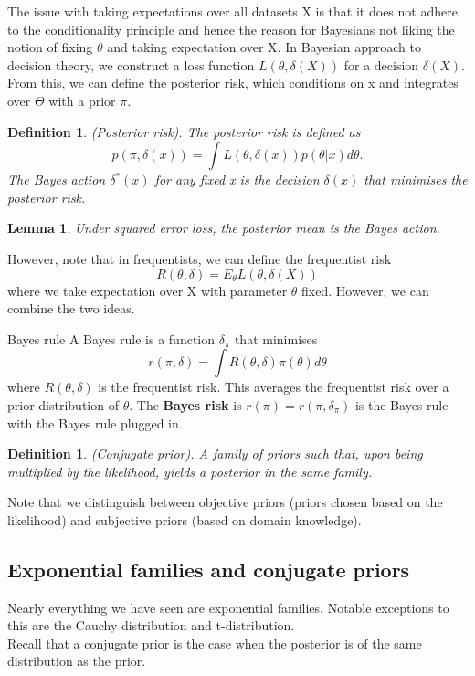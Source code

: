 \documentclass[twoside]{article}
\newtheorem{lemma}[theorem]{Lemma}
\newtheorem{definition}[theorem]{Definition}
\begin{document}
The issue with taking expectations over all datasets X is that it does not adhere to the conditionality principle and hence the reason for Bayesians not liking the notion of fixing $\theta$ and taking expectation over X.\newline
In Bayesian approach to decision theory, we construct a loss function $L(\theta,\delta(X))$ for a decision $\delta(X).$ From this, we can define the posterior risk, which conditions on x and integrates over $\Theta$ with a prior $\pi$.

\begin{definition}(Posterior risk). The posterior risk is defined as 
$$
p(\pi, \delta(x)) = \int L(\theta,\delta(x))p(\theta|x)d\theta.
$$
The Bayes action $\delta^*(x)$ for any fixed x is the decision $\delta(x)$ that minimises the posterior risk.
\end{definition}

\begin{lemma}Under squared error loss, the posterior mean is the Bayes action.
\end{lemma}

However, note that in frequentists, we can define the frequentist risk 
$$
R(\theta,\delta) = E_{\theta}L(\theta, \delta(X))
$$
where we take expectation over X with parameter $\theta$ fixed. However, we can combine the two ideas.

\begin{definition_exam}{Bayes rule}{} A Bayes rule is a function $\delta_{\pi}$ that minimises 
$$
r(\pi, \delta) = \int R(\theta, \delta)\pi(\theta)d\theta
$$
where $R(\theta,\delta)$ is the frequentist risk. This averages the frequentist risk over a prior distribution of $\theta.$\newline 
The \textbf{Bayes risk} is $r(\pi) = r(\pi,\delta_{\pi})$ is the Bayes rule with the Bayes rule plugged in.
\end{definition_exam}

\begin{definition}(Conjugate prior). A family of priors such that, upon being multiplied by the likelihood, yields a posterior in the same family.
\end{definition}

Note that we distinguish between objective priors (priors chosen based on the likelihood) and subjective priors (based on domain knowledge).\\

\subsection{Exponential families and conjugate priors}
Nearly everything we have seen are exponential families. Notable exceptions to this are the Cauchy distribution and t-distribution.\\
Recall that a conjugate prior is the case when the posterior is of the same distribution as the prior.
\end{document}
